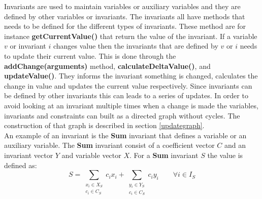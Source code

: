 Invariants are used to maintain variables or auxiliary variables and they are defined by other variables or invariants. 
The invariants all have methods that needs to be defined for the different types of invariants. These method are 
for instance \textbf{getCurrentValue()} that return the value of the invariant. If a variable $v$ or invariant $i$ 
changes value then the invariants that are defined by $v$ or $i$ needs to update their current value. This is done 
through the \textbf{addChange(arguments)} method, \textbf{calculateDeltaValue()}, and  \textbf{updateValue()}. They 
informs the invariant something is changed, calculates the change in value and updates the current value respectively. 
Since invariants can be defined by other invariants this can leads to a series of updates. In order to avoid looking at 
an invariant multiple times when a change is made the variables, invariants and constraints can built as a 
directed graph without cycles. The construction of that graph is described in section \ref{updategraph}. \\ 
An example of an invariant is the \textbf{Sum} invariant that defines a variable or an auxiliary variable. The 
\textbf{Sum} invariant consist of a coefficient vector $C$ and an invariant vector $Y$ and variable vector $X$. For 
a \textbf{Sum} invariant $S$ the value is defined as: \\
\begin{equation}
 S = \sum_{\substack{x_i \in X_S\\ c_i \in C_S }}  c_i x_i + \sum_{\substack{y_i \in Y_S\\ c_i \in C_S }}  c_i y_i 
\qquad \forall i \in I_S
\end{equation}



